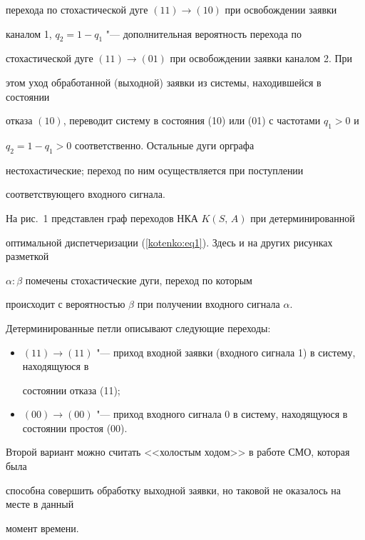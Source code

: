 перехода по стохастической дуге $(11)\to (10)$ при освобождении заявки

каналом 1, $q_2=1-q_1$ "--- дополнительная вероятность перехода по

стохастической дуге $(11)\to (01)$ при освобождении заявки каналом 2. При

этом уход обработанной (выходной) заявки из системы, находившейся в состоянии

отказа $(10)$, переводит систему в состояния (10) или (01) с частотами $q_1>0$ и

$q_2=1-q_1>0$ соответственно. Остальные дуги орграфа

нестохастические; переход по ним осуществляется при поступлении

соответствующего входного сигнала.



На рис.~1 представлен граф переходов НКА $K(S,\,A)$ при детерминированной

оптимальной диспетчеризации (\ref{kotenko:eq1}). Здесь и на других рисунках разметкой

$\alpha :\beta $ помечены стохастические дуги, переход по которым

происходит с вероятностью $\beta $ при получении входного сигнала $\alpha $.

Детерминированные петли описывают следующие переходы:

\begin{itemize}

\item[]

$(11)\to (11)$ "--- приход входной заявки (входного сигнала 1) в систему, находящуюся в

состоянии отказа (11);

\item[]

$(00)\to (00)$ "--- приход входного сигнала 0 в систему, находящуюся в состоянии простоя (00).



\end{itemize}

Второй вариант можно считать <<холостым ходом>> в работе СМО, которая была

способна совершить обработку выходной заявки, но таковой не оказалось на месте в данный

момент времени.



